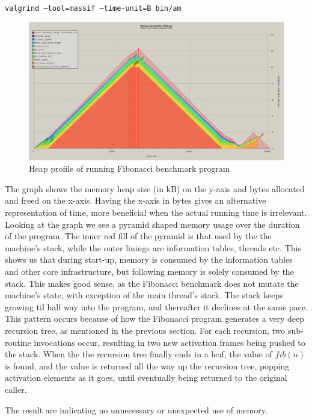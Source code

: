 {\tt valgrind --tool=massif --time-unit=B bin/am}

\begin{figure}[H]
  \centering
  \includegraphics[scale=0.35]{figures/fig-mem}
  \caption{Heap profile of \thename{} running Fibonacci benchmark program}
\label{fig:heap-profile}
\end{figure}

The graph shows the memory heap size (in kB) on the y-axis and bytes allocated
and freed on the x-axis. Having the x-axis in bytes gives an alternative
representation of time, more beneficial when the actual running time is
irrelevant. Looking at the graph we see a pyramid shaped memory usage over the
duration of the program. The inner red fill of the pyramid is that used by the
the machine's stack, while the outer linings are information tables, threads
etc. This shows us that during start-up, memory is consumed by the information
tables and other core infrastructure, but following memory is solely consumed by
the stack. This makes good sense, as the Fibonacci benchmark does not mutate the
machine's state, with exception of the main thread's stack. The stack keeps
growing til half way into the program, and thereafter it declines at the same
pace. This pattern occurs because of how the Fibonacci program generates a very
deep recursion tree, as mentioned in the previous section. For each recursion,
two sub-routine invocations occur, resulting in two new activation frames being
pushed to the stack. When the the recursion tree finally ends in a leaf, the
value of $fib(n)$ is found, and the value is returned all the way up the
recursion tree, popping activation elements as it goes, until eventually being
returned to the original caller.

The result are indicating no unnecessary or unexpected use of memory.

